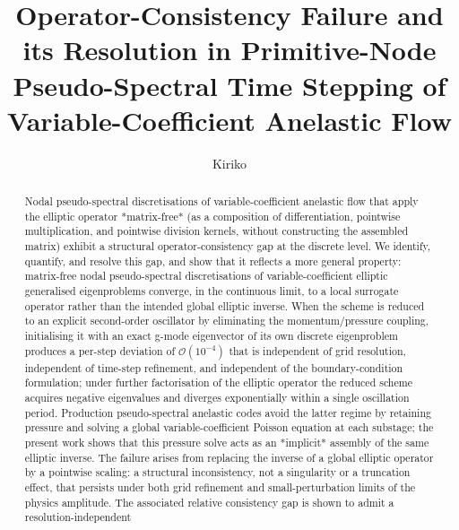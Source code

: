 \documentclass[a4paper,fleqn]{cas-sc}
\begin{document}
\let\WriteBookmarks\relax
\def\floatpagepagefraction{1}
\def\textpagefraction{.001}


\title[mode = title]{Operator-Consistency Failure and its Resolution in
Primitive-Node Pseudo-Spectral Time Stepping of
Variable-Coefficient Anelastic Flow}

\author[1]{Kiriko}
\cormark[1]



\begin{abstract}
Nodal pseudo-spectral discretisations of variable-coefficient
anelastic flow that apply the elliptic operator *matrix-free* (as a
composition of differentiation, pointwise multiplication, and
pointwise division kernels, without constructing the assembled
matrix) exhibit a structural operator-consistency gap at the
discrete level.  We identify, quantify, and resolve this gap, and
show that it reflects a more general property: matrix-free nodal
pseudo-spectral discretisations of variable-coefficient elliptic
generalised eigenproblems converge, in the continuous limit, to a
local surrogate operator rather than the intended global elliptic
inverse.  When the scheme is reduced to an explicit second-order oscillator by
eliminating the momentum/pressure coupling, initialising it with an
exact g-mode eigenvector of its own discrete eigenproblem produces a
per-step deviation of
$\mathcal{O}(10^{-4})$ that is independent of grid resolution,
independent of time-step refinement, and independent of the
boundary-condition formulation; under further factorisation of the
elliptic operator the reduced scheme acquires negative eigenvalues
and diverges exponentially within a single oscillation period.
Production pseudo-spectral anelastic codes avoid the latter regime by
retaining pressure and solving a global variable-coefficient Poisson
equation at each substage; the present work shows that this pressure
solve acts as an *implicit* assembly of the same elliptic inverse.  The failure
arises from replacing the inverse of a global elliptic operator by a
pointwise scaling: a structural inconsistency, not a singularity or
a truncation effect, that persists under both grid refinement and
small-perturbation limits of the physics amplitude.  The associated
relative consistency gap is shown to admit a resolution-independent

\end{abstract}
\end{document}
